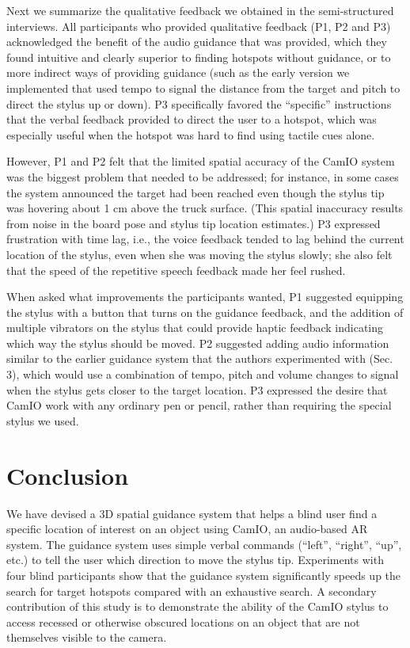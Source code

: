 \documentclass[runningheads]{res/templates/llncs}
\begin{document}
Next we summarize the qualitative feedback we obtained in the semi-structured interviews. 
All participants who provided qualitative feedback (P1, P2 and P3) acknowledged the benefit of the audio guidance that was provided, which they found intuitive and clearly superior to finding hotspots without guidance, or to more indirect ways of providing guidance (such as the early version we implemented that used tempo to signal the distance from the target and pitch to direct the stylus up or down). P3 specifically favored the ``specific'' instructions that the verbal feedback provided to direct the user to a hotspot, which was especially useful when the hotspot was hard to find using tactile cues alone. 

However, P1 and P2 felt that the limited spatial accuracy of the CamIO system was the biggest problem that needed to be addressed; for instance, in some cases the system announced the target had been reached even though the stylus tip was hovering about 1 cm above the truck surface. (This spatial inaccuracy
results from noise in the board pose and stylus tip location estimates.)
P3 expressed frustration with time lag, i.e., the voice feedback tended to lag behind the current location of the stylus, even when she was moving the stylus slowly; she also felt that the speed of the repetitive speech feedback made her feel rushed.

When asked what improvements the participants wanted, P1 suggested equipping the stylus with a button that turns on the guidance feedback, and the addition of multiple vibrators on the stylus that could provide haptic feedback indicating which way the stylus should be moved. 
P2 suggested adding audio information similar to the earlier guidance system that the authors experimented with (Sec. 3), which would use a combination of tempo, pitch and volume changes to signal when the stylus gets closer to the target location. 
P3 expressed the desire that CamIO work with any ordinary pen or pencil, rather than requiring the special stylus we used.

\hypertarget{conclusion}{%
\section{Conclusion}\label{conclusion}}

We have devised a 3D spatial guidance system that helps a blind user find a specific location of interest on an object using CamIO, an audio-based AR system. 
The guidance system uses simple verbal commands (``left'', ``right'', ``up'', etc.) to tell the user which direction to
move the stylus tip. Experiments with four blind participants show that the guidance system significantly speeds up the search for target hotspots compared with an exhaustive search. 
A secondary contribution of this study is to demonstrate the ability of the CamIO stylus to access recessed or otherwise obscured locations on an object that are not themselves visible to the camera.
\end{document}
